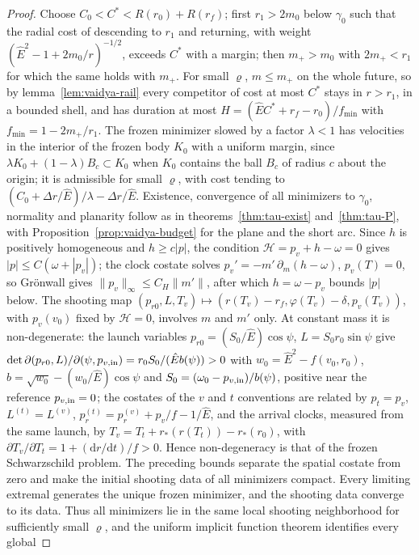 \documentclass[aip,jmp,amsmath,amssymb,reprint]{revtex4-2}
\newcommand{\Ehat}{\hat E}
\newcommand{\dd}{\mathrm{d}}
\theoremstyle{plain}
\theoremstyle{definition}
\begin{document}
\begin{proof}
Choose $C_0<C^*<R(r_0)+R(r_f)$; first $r_1>2m_0$ below $\gamma_0$ such that the radial cost of
descending to $r_1$ and returning, with weight $(\Ehat^2-1+2m_0/r)^{-1/2}$, exceeds $C^*$ with a
margin; then $m_+>m_0$ with $2m_+<r_1$ for which the same holds with $m_+$. For small $\varrho$,
$m\le m_+$ on the whole future, so by lemma~\ref{lem:vaidya-rail} every competitor of cost at most
$C^*$ stays in $r>r_1$, in a bounded shell, and has duration at most
$H=(\Ehat C^*+r_f-r_0)/f_{\min}$ with $f_{\min}=1-2m_+/r_1$. The frozen minimizer slowed by a factor
$\lambda<1$ has velocities in the interior of the frozen body $K_0$ with a uniform margin, since
$\lambda K_0+(1-\lambda)B_c\subset K_0$ when $K_0$ contains the ball $B_c$ of radius $c$ about the origin; it is admissible for small $\varrho$, with cost tending to
$(C_0+\Delta r/\Ehat)/\lambda-\Delta r/\Ehat$. Existence, convergence of all minimizers to $\gamma_0$,
normality and planarity follow as in theorems~\ref{thm:tau-exist} and~\ref{thm:tau-P}, with
Proposition~\ref{prop:vaidya-budget} for the plane and the short arc. Since $h$ is
positively homogeneous and $h\ge c|p|$, the condition $\mathcal H=p_v+h-\omega=0$ gives
$|p|\le C(\omega+|p_v|)$; the clock costate solves $p_v'=-m'\,\partial_m(h-\omega)$, $p_v(T)=0$, so Gr\"onwall
gives $\|p_v\|_\infty\le C_H\|m'\|$, after which $h=\omega-p_v$ bounds $|p|$ below. The shooting map
$(p_{r0},L,T_v)\mapsto(r(T_v)-r_f,\varphi(T_v)-\delta,p_v(T_v))$, with $p_v(v_0)$ fixed by $\mathcal H=0$,
involves $m$ and $m'$ only. At constant mass it is non-degenerate: the launch variables
$p_{r0}=(S_0/\Ehat)\cos\psi$, $L=S_0r_0\sin\psi$ give
$\det\partial(p_{r0},L)/\partial(\psi,p_{v,{\rm in}})=r_0S_0/(\Ehat b(\psi))>0$ with
$w_0=\Ehat^2-f(v_0,r_0)$, $b=\sqrt{w_0}-(w_0/\Ehat)\cos\psi$ and $S_0=(\omega_0-p_{v,{\rm in}})/b(\psi)$, positive near
the reference $p_{v,{\rm in}}=0$; the costates of the $v$ and $t$ conventions are related by
$p_t=p_v$, $L^{(t)}=L^{(v)}$, $p_r^{(t)}=p_r^{(v)}+p_v/f-1/\Ehat$, and the arrival clocks, measured from the
same launch, by $T_v=T_t+r_*(r(T_t))-r_*(r_0)$, with $\partial T_v/\partial T_t=1+(\dd r/\dd t)/f>0$.
Hence non-degeneracy is that of the frozen Schwarzschild problem. The preceding bounds
separate the spatial costate from zero and make the initial shooting data of all minimizers
compact. Every limiting extremal generates the unique frozen minimizer, and the shooting
data converge to its data. Thus all minimizers lie in the same local shooting neighborhood
for sufficiently small $\varrho$, and the uniform implicit function theorem identifies every global

\end{proof}
\end{document}
